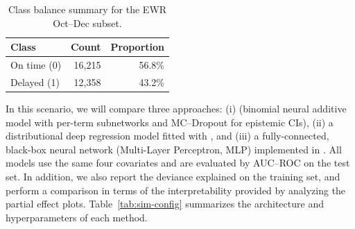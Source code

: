 \begin{table}[h!]
\centering
\caption{Class balance summary for the EWR Oct–Dec subset.}
\label{tab:flights-balance}
\begin{tabular}{lrr}
\toprule
Class & Count & Proportion \\
\midrule
On time (0) & 16,215 & 56.8\% \\
Delayed (1) & 12,358 & 43.2\% \\
\bottomrule
\end{tabular}
\end{table}

In this scenario, we will compare three approaches: (i)  (binomial neural additive model with per-term subnetworks and MC–Dropout for epistemic CIs), (ii) a distributional deep regression model fitted with , and (iii) a fully-connected, black-box neural network (Multi-Layer Perceptron, MLP) implemented in . All models use the same four covariates and are evaluated by AUC–ROC on the test set. In addition, we also report the deviance explained on the training set, and perform a comparison in terms of the interpretability provided by analyzing the partial effect plots. Table~\ref{tab:sim-config} summarizes the architecture and hyperparameters of each method. 

